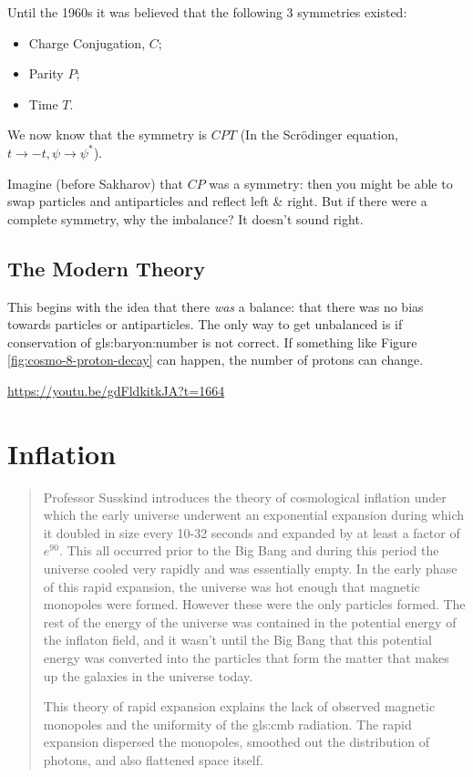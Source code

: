 \documentclass[]{article}
\begin{document}
Until the 1960s it was believed that the following 3 symmetries existed:
\begin{itemize}
	\item Charge Conjugation, $C$;
	\item Parity $P$;
	\item Time $T$.
\end{itemize} 

We now know that the symmetry is $CPT$ (In the Scr\"odinger equation, $t\rightarrow-t, \psi\rightarrow\psi^{*}$).

Imagine (before Sakharov) that $CP$ was a symmetry: then you might be able to swap particles and antiparticles and reflect left \& right. But if there were a complete symmetry, why the imbalance? It doesn't sound right.

\subsection{The Modern Theory}
 This begins with the idea that there \emph{was} a balance: that there was no bias towards particles or antiparticles. The only way to get unbalanced is if conservation of \gls{gls:baryon:number} is not correct. If something like Figure \ref{fig:cosmo-8-proton-decay} can happen, the number of protons can change.
 
 \url{https://youtu.be/gdFldkitkJA?t=1664}
 
\section{Inflation}

\begin{quotation}
	Professor Susskind introduces the theory of cosmological inflation under which the early universe underwent an exponential expansion during which it doubled in size every 10-32 seconds and expanded by at least a factor of $e^{90}$.  This all occurred prior to the Big Bang and during this period the universe cooled very rapidly and was essentially empty.  In the early phase of this rapid expansion, the universe was hot enough that magnetic monopoles were formed.  However these were the only particles formed.  The rest of the energy of the universe was contained in the potential energy of the inflaton field, and it wasn't until the Big Bang that this potential energy was converted into the particles that form the matter that makes up the galaxies in the universe today.
	
	This theory of rapid expansion explains the lack of observed magnetic monopoles and the uniformity of the \gls{gls:cmb} radiation.  The rapid expansion dispersed the monopoles, smoothed out the distribution of photons, and also flattened space itself.
	
\end{quotation}
\end{document}
